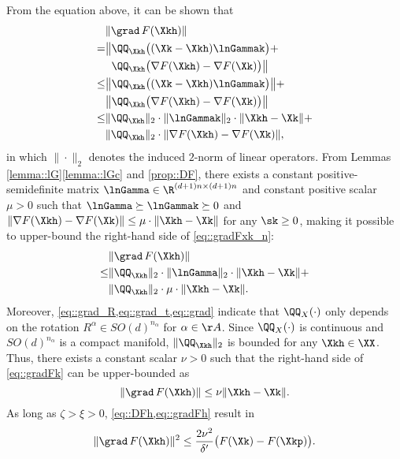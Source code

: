From the equation above, it can be shown that
\begin{equation}\label{eq::gradFxk_n}
	\begin{aligned}
		&\|\grad\, F(\Xkh)\|\\
		=&\big\|\QQ_{\Xkh}\big((\Xk-\Xkh)\lnGammak\big)+\\
		&\hphantom{\big\|}\QQ_{\Xkh}\big(\nabla F(\Xkh)-\nabla F(\Xk)\big)\big\| \\
		\leq&\big\|\QQ_{\Xkh}\big((\Xk-\Xkh)\lnGammak\big)\big\|+\\
		&\big\|\QQ_{\Xkh}\big(\nabla F(\Xkh)-\nabla F(\Xk)\big)\big\| \\
		\leq& \|\QQ_{\Xkh}\|_2\cdot \|\lnGammak\|_2\cdot\|\Xkh-\Xk\|+\\
		&\|\QQ_{\Xkh}\|_2\cdot\|\nabla F(\Xkh)-\nabla F(\Xk)\|,
	\end{aligned}
\end{equation}
in which $\|\cdot\|_2$ denotes the induced $2$-norm of linear operators. From Lemmas \ref{lemma::lG}\ref{lemma::lGc} and \ref{prop::DF}, there exists a constant positive-semidefinite matrix $\lnGamma\in \R^{(d+1)n\times(d+1)n}$ and constant positive scalar $\mu > 0$ such that $\lnGamma \succeq \lnGammak \succeq 0$ and $\|\nabla F(\Xkh)-\nabla F(\Xk)\|\leq \mu\cdot\|\Xkh-\Xk\|$ for any $\sk\geq 0$, making it possible to upper-bound the right-hand side of \cref{eq::gradFxk_n}: 
\begin{equation}\label{eq::gradFk}
\begin{aligned}
	&\|\grad\, F(\Xkh)\|\\
\leq&\|\QQ_{\Xkh}\|_2\cdot \|\lnGamma\|_2\cdot\|\Xkh-\Xk\|+\\
	&\|\QQ_{\Xkh}\|_2\cdot\mu\cdot\|\Xkh-\Xk\|.
\end{aligned}
\end{equation}
Moreover, \cref{eq::grad_R,eq::grad_t,eq::grad} indicate that  $\QQ_X(\cdot)$ only depends on the rotation $R^\alpha\in SO(d)^{n_\alpha}$ for $\alpha\in\AA$. Since $\QQ_{X}(\cdot)$ is continuous and $SO(d)^{n_\alpha}$ is a compact manifold, $\|\QQ_{\Xkh}\|_2$ is bounded for any $\Xkh\in\XX$.
Thus, there exists a constant scalar $\nu > 0$ such that the right-hand side of \cref{eq::gradFk} can be upper-bounded as
\begin{equation}\label{eq::gradFh}
\|\grad\, F(\Xkh)\|\leq \nu \|\Xkh-\Xk\|.
\end{equation} 
As long as $\zeta>\xi>0$, \cref{eq::DFh,eq::gradFh} result in
\begin{equation}
\nonumber
\|\grad\, F(\Xkh)\|^2 \leq  \frac{2\nu^2}{\delta'}\big(F(\Xk)-F(\Xkp)\big).
\end{equation}
